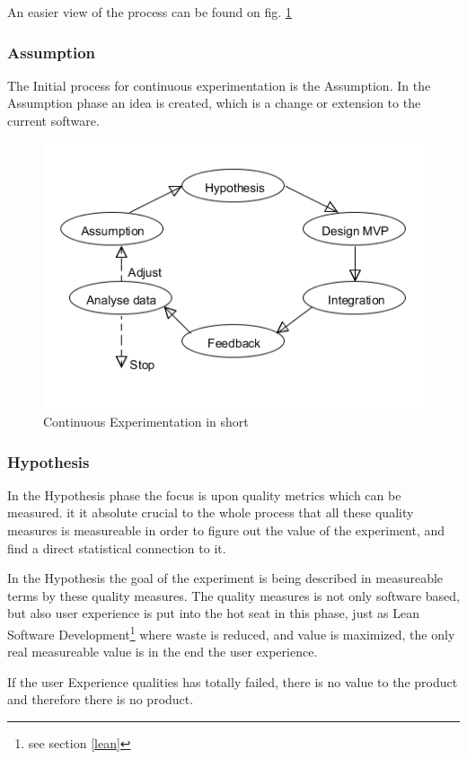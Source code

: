\documentclass{sig-alternate}
\begin{document}
An easier view of the process can be found on fig. \ref{fig:continuousdev}

\subsubsection{Assumption}
\label{cx:assumption}
The Initial process for continuous experimentation is the Assumption.
In the Assumption phase an idea is created, which is a change or extension to the current software.

\begin{figure}
\centering
\caption{Continuous Experimentation in short}
\label{fig:continuousdev}
\includegraphics[scale=0.5]{Umlet/conexp}
\end{figure}

\subsubsection{Hypothesis}
\label{cx:hypothesis}
In the Hypothesis phase the focus is upon quality metrics which can be measured.
it it absolute crucial to the whole process that all these quality measures is measureable in order to figure 
out the value of the experiment, and find a direct statistical connection to it. 

In the Hypothesis the goal of the experiment is being described in measureable terms by these quality measures. 
The quality measures is not only software based, but also user experience is put into the hot seat in this 
phase, just as Lean Software Development\footnote{\label{see-lean}see section \ref{lean}} where waste is reduced, and value is maximized, the only real measureable value is in the end the user experience. 

If the user Experience qualities has totally failed, there is no value to the product and therefore there is 
no product.
\end{document}
